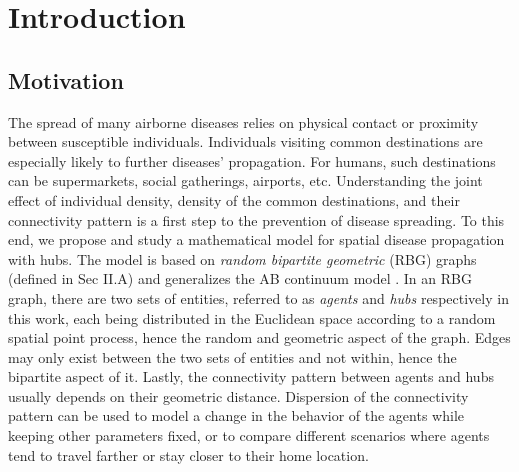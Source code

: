 \section{Introduction}
\subsection{Motivation}
The spread of many airborne diseases relies on physical contact or proximity between susceptible individuals. Individuals visiting common destinations are especially likely to further diseases' propagation. For humans, such destinations can be supermarkets, social gatherings, airports, etc. Understanding the joint effect of individual density, density of the common destinations, and their connectivity pattern is a first step to the prevention of disease spreading.
To this end, we propose and study a
 mathematical model for spatial disease propagation with hubs. The model is based on \textit{random bipartite geometric} (RBG) graphs (defined in Sec II.A) and generalizes the AB continuum model \cite{iyer2012percolation,penrose_2014}.
In an RBG graph, there are two sets of entities,  referred to as \textit{agents} and \textit{hubs} respectively in this work, each being distributed in the Euclidean space according to a random spatial point process, hence the random and geometric aspect of the graph. Edges may only exist between the two sets of entities and not within, hence the bipartite aspect of it. {Lastly, the connectivity pattern between agents and hubs usually depends on their geometric distance. Dispersion of the connectivity pattern can be used to model a change in the behavior of the agents while keeping other parameters fixed, or to compare different scenarios where agents tend to travel farther or stay closer to their home location. }


